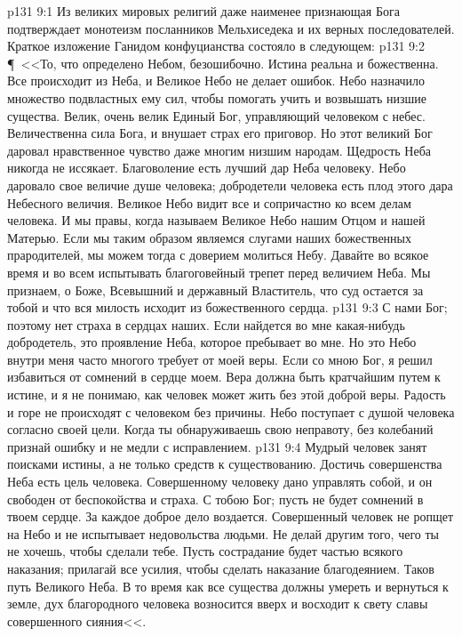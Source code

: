 \vs p131 9:1 Из великих мировых религий даже наименее признающая Бога подтверждает монотеизм посланников Мельхиседека и их верных последователей. Краткое изложение Ганидом конфуцианства состояло в следующем:
\vs p131 9:2 \P\ <<То, что определено Небом, безошибочно. Истина реальна и божественна. Все происходит из Неба, и Великое Небо не делает ошибок. Небо назначило множество подвластных ему сил, чтобы помогать учить и возвышать низшие существа. Велик, очень велик Единый Бог, управляющий человеком с небес. Величественна сила Бога, и внушает страх его приговор. Но этот великий Бог даровал нравственное чувство даже многим низшим народам. Щедрость Неба никогда не иссякает. Благоволение есть лучший дар Неба человеку. Небо даровало свое величие душе человека; добродетели человека есть плод этого дара Небесного величия. Великое Небо видит все и сопричастно ко всем делам человека. И мы правы, когда называем Великое Небо нашим Отцом и нашей Матерью. Если мы таким образом являемся слугами наших божественных прародителей, мы можем тогда с доверием молиться Небу. Давайте во всякое время и во всем испытывать благоговейный трепет перед величием Неба. Мы признаем, о Боже, Всевышний и державный Властитель, что суд остается за тобой и что вся милость исходит из божественного сердца.
\vs p131 9:3 С нами Бог; поэтому нет страха в сердцах наших. Если найдется во мне какая\hyp{}нибудь добродетель, это проявление Неба, которое пребывает во мне. Но это Небо внутри меня часто многого требует от моей веры. Если со мною Бог, я решил избавиться от сомнений в сердце моем. Вера должна быть кратчайшим путем к истине, и я не понимаю, как человек может жить без этой доброй веры. Радость и горе не происходят с человеком без причины. Небо поступает с душой человека согласно своей цели. Когда ты обнаруживаешь свою неправоту, без колебаний признай ошибку и не медли с исправлением.
\vs p131 9:4 Мудрый человек занят поисками истины, а не только средств к существованию. Достичь совершенства Неба есть цель человека. Совершенному человеку дано управлять собой, и он свободен от беспокойства и страха. С тобою Бог; пусть не будет сомнений в твоем сердце. За каждое доброе дело воздается. Совершенный человек не ропщет на Небо и не испытывает недовольства людьми. Не делай другим того, чего ты не хочешь, чтобы сделали тебе. Пусть сострадание будет частью всякого наказания; прилагай все усилия, чтобы сделать наказание благодеянием. Таков путь Великого Неба. В то время как все существа должны умереть и вернуться к земле, дух благородного человека возносится вверх и восходит к свету славы совершенного сияния<<.
